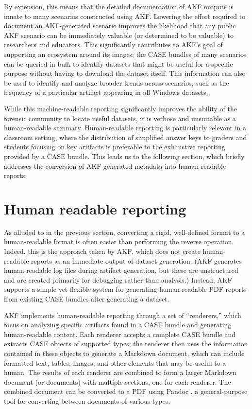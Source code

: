 \documentclass[letterpaper,12pt]{report}
\begin{document}
By extension, this means that the detailed documentation of AKF outputs
is innate to many scenarios constructed using AKF. Lowering the effort
required to document an AKF-generated scenario improves the likelihood
that any public AKF scenario can be immediately valuable (or determined
to be valuable) to researchers and educators. This significantly
contributes to AKF's goal of supporting an ecosystem around its images;
the CASE bundles of many scenarios can be queried in bulk to identify
datasets that might be useful for a specific purpose without having to
download the dataset itself. This information can also be used to
identify and analyze broader trends across scenarios, such as the
frequency of a particular artifact appearing in all Windows datasets.

While this machine-readable reporting significantly improves the ability
of the forensic community to locate useful datasets, it is verbose and
unsuitable as a human-readable summary. Human-readable reporting is
particularly relevant in a classroom setting, where the distribution of
simplified answer keys to graders and students focusing on key artifacts
is preferable to the exhaustive reporting provided by a CASE bundle.
This leads us to the following section, which briefly addresses the
conversion of AKF-generated metadata into human-readable reports.

\section{Human readable reporting}\label{human-readable-reporting}

As alluded to in the previous section, converting a rigid, well-defined
format to a human-readable format is often easier than performing the
reverse operation. Indeed, this is the approach taken by AKF, which does
not create human-readable reports as an immediate output of dataset
generation. (AKF generates human-readable log files during artifact
generation, but these are unstructured and are created primarily for
debugging rather than analysis.) Instead, AKF supports a simple yet
flexible system for generating human-readable PDF reports from existing
CASE bundles after generating a dataset.

AKF implements human-readable reporting through a set of ``renderers,''
which focus on analyzing specific artifacts found in a CASE bundle and
generating human-readable content. Each renderer accepts a complete CASE
bundle and extracts CASE objects of supported types; the renderer then
uses the information contained in these objects to generate a Markdown
document, which can include formatted text, tables, images, and other
elements that may be useful to a human. The results of each renderer are
combined to form a larger Markdown document (or documents) with multiple
sections, one for each renderer. The combined document can be converted
to a PDF using Pandoc \cite{macfarlanePandoc2025}, a general-purpose
tool for converting between documents of various types.
\end{document}

